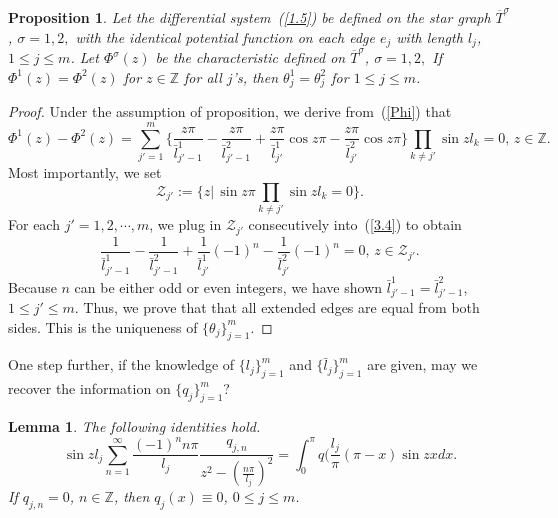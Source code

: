 \documentclass[10pt,a4paper]{article}
\theoremstyle{plain}
\newtheorem{lemma}[theorem]{Lemma}
\newtheorem{proposition}[theorem]{Proposition}
\theoremstyle{definition}
\theoremstyle{remark}
\numberwithin{equation}{section}
\begin{document}
\begin{proposition}\label{T3.2}
Let the differential system~(\ref{1.5}) be defined on the star graph 
$\overline{T}^{\sigma}$, $\sigma=1,2,$ with the identical potential function on each  edge $e_{j}$ with length $l_{j}$, $1\leq j\leq m$. Let $\Phi^{\sigma}(z)$ be the characteristic defined on $\overline{T}^{\sigma}$, $\sigma=1,2,$ If $ \Phi^{1}(z)=\Phi^{2}(z)$ for $z\in\mathbb{Z}$ for all $j$'s, then $\theta^{1}_{j}=\theta^{2}_{j}$ for $1\leq j\leq m$.
\end{proposition}
\begin{proof}
Under the assumption of proposition, we derive from~(\ref{Phi}) that
\begin{equation}
\Phi^{1}(z)-\Phi^{2}(z)=\sum_{j'=1}^{m}
\{\frac{z\pi}{\bar{l}_{j'-1}^{1}}-\frac{z\pi}{\bar{l}_{j'-1}^{2}}+\frac{z\pi}{\bar{l}_{j'}^{1}}\cos{z\pi}-\frac{z\pi}{\bar{l}_{j'}^{2}}\cos{z\pi}\}\prod_{k\neq j'}\sin{z l_{k}}=0,\,z\in\mathbb{Z}.\label{3.4}
\end{equation}%
Most importantly, we set
\begin{equation}
\mathcal{Z}_{j'}:=\big\{z|\,\sin{z\pi}\prod_{k\neq j'}\sin{z l_{k}}=0\big\}.
\end{equation}
For each $j'=1,2,\cdots,m$, we plug in $\mathcal{Z}_{j'}$ consecutively into~(\ref{3.4}) to obtain
\begin{equation}
\frac{1}{\bar{l}_{j'-1}^{1}}-\frac{1}{\bar{l}_{j'-1}^{2}}+\frac{1}{\bar{l}_{j'}^{1}}(-1)^{n}-\frac{1}{\bar{l}_{j'}^{2}}(-1)^{n}=0,\,z\in\mathcal{Z}_{j'}.\label{3.6}
\end{equation}
Because $n$ can be either odd or even integers, we have shown $\bar{l}^{1}_{j'-1}=\bar{l}^{2}_{j'-1}$, $1\leq j'\leq m$.
Thus,
we prove that that all extended edges are equal from both sides. This is the uniqueness of $\{\theta_{j}\}_{j=1}^{m}$.

\end{proof}
One step further, if the knowledge of $\{l_{j}\}_{j=1}^{m}$ and $\{\bar{l}_{j}\}_{j=1}^{m}$ are given, may we recover the information on $\{q_{j}\}_{j=1}^{m}$?
\begin{lemma}\label{LL33}
The following identities hold.
\begin{equation}
\sin{z l_{j}}\sum_{n=1}^{\infty}\frac{(-1)^{n}n\pi}{l_{j}}\frac{q_{j,n}}{z^{2}-(\frac{n\pi}{l_{j}})^{2}}=\int_{0}^{\pi}q(\frac{l_{j}}{\pi}(\pi-x)\sin{zx}dx.
\end{equation}
If $q_{j,n}=0$, $n\in\mathbb{Z}$, then $q_{j}(x)\equiv0$, $0\leq j\leq m$.
\end{lemma}
\end{document}
